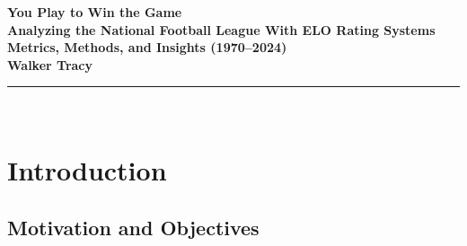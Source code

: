 \documentclass[a4paper,10.5pt,twoside]{article}
\begin{document}

\begin{center}
\LARGE\textbf{You Play to Win the Game}\\[12pt]
\normalsize\textbf{Analyzing the National Football League With ELO Rating Systems}\\[10pt]
\normalsize\textbf{Metrics, Methods, and Insights (1970--2024)}\\[10pt]
\normalsize\textbf{Walker Tracy}\\[5pt]
\rule{\textwidth}{1 pt}\\[20pt]
\end{center}


\begin{abstract}\normalsize
\RaggedRight 
This paper presents an analytical framework for evaluating National Football League (NFL) team performances through the usage and iteration of an ELO rating system. Through the development of other metrics such as luck indices, parity measurement, calibration analyses, and strength-of-schedule calculations, I have created a holistic view of team performance beyond a win-loss record. This system utilizes 50 years of historical NFL regular-season game data from 1970 to the present and generates 15+ distinct visualizations that show patterns in overall league and conference competitiveness, team trajectory, and historical performance. This work demonstrates how rating systems can show the complex dynamics of football by providing insights into dynasty formation, competitive forces, and the role of luck and skill in close-game outcomes.\\[1em]
\justifying

{\noindent\textbf{Keywords: }\RaggedRight
ELO rating; NFL; competitive balance; calibration; strength of schedule; parity; Pythagorean expectation; forecasting; luck index.\par}
\end{abstract}


\section{Introduction}

\subsection{Motivation and Objectives}
\end{document}
